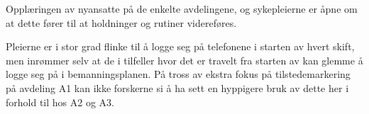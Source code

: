 \noindent
Opplæringen av nyansatte på de enkelte avdelingene, og sykepleierne er åpne om at dette  fører til at holdninger og rutiner videreføres.

\noindent
Pleierne er i stor grad flinke til å logge seg på telefonene i starten av hvert skift, men inrømmer selv at de i tilfeller hvor det er travelt fra starten av kan glemme å logge seg på i bemanningsplanen.
På tross av ekstra fokus på tilstedemarkering på avdeling A1 kan ikke forskerne si å ha sett en hyppigere bruk av dette her i forhold til hos A2 og A3. 


